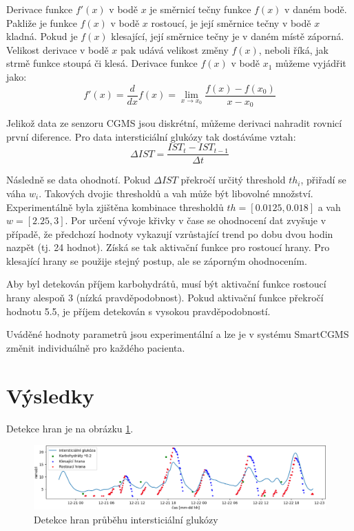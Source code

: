 \documentclass{template_svk}
\begin{document}
Derivace funkce $f'(x)$ v bodě $x$ je směrnicí tečny funkce $f(x)$ v daném bodě. Pakliže je funkce $f(x)$ v bodě $x$ rostoucí, je její směrnice tečny v bodě $x$ kladná. Pokud je $f(x)$ klesající, její směrnice tečny je v daném místě záporná. Velikost derivace v bodě $x$ pak udává velikost změny $f(x)$, neboli říká, jak strmě funkce stoupá či klesá. Derivace funkce $f(x)$ v bodě $x_{1}$ můžeme vyjádřit jako:
\begin{equation}
f'(x) = \frac{d}{dx}f(x) = \lim_{x \to x_{0}} \frac{f(x)-f(x_{0})}{x-x_{0}}
\end{equation}

Jelikož data ze senzoru CGMS jsou diskrétní, můžeme derivaci nahradit rovnicí první diference. Pro data intersticiální glukózy tak dostáváme vztah:
\begin{equation}
\Delta IST = \frac{IST_{t} - IST_{t-1}}{\Delta t}
\end{equation}

Následně se data ohodnotí. Pokud $\Delta IST$ překročí určitý threshold $th_{i}$, přiřadí se váha $w_{i}$. Takových dvojic thresholdů a vah může být libovolné množství. Experimentálně byla zjištěna kombinace thresholdů $th=[0.0125, 0.018]$ a vah $w=[2.25, 3]$. Por určení vývoje křivky v čase se ohodnocení dat zvyšuje v případě, že předchozí hodnoty vykazují vzrůstající trend po dobu dvou hodin nazpět (tj. 24 hodnot). Získá se tak aktivační funkce pro rostoucí hrany. Pro klesající hrany se použije stejný postup, ale se záporným ohodnocením.

Aby byl detekován příjem karbohydrátů, musí být aktivační funkce rostoucí hrany alespoň 3 (nízká  pravděpodobnost). Pokud aktivační funkce překročí hodnotu 5.5, je příjem detekován s vysokou pravděpodobností.

Uváděné hodnoty parametrů jsou experimentální a lze je v systému SmartCGMS změnit individuálně pro každého pacienta.

\section{Výsledky}

Detekce hran je na obrázku \ref{obr}.

\begin{figure}[!ht]
  \centering
  \includegraphics[width=1\textwidth]{hrany2}
  \caption{Detekce hran průběhu intersticiální glukózy}
  \label{obr}
\end{figure}
\end{document}
